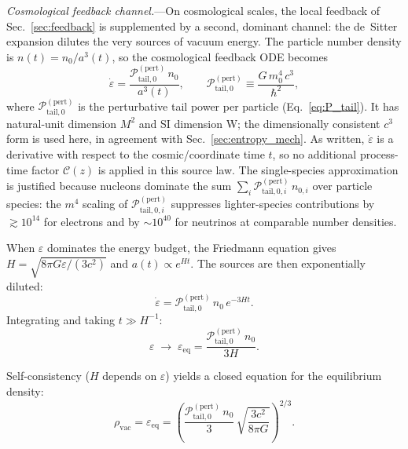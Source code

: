 \documentclass[aps,prd,onecolumn,superscriptaddress,nofootinbib,showpacs,12pt,notitlepage]{revtex4-2}
\begin{document}
\textit{Cosmological feedback channel.}---On cosmological
scales, the local feedback of Sec.~\ref{sec:feedback}
is supplemented by a second, dominant channel: the
de~Sitter expansion dilutes the very sources of vacuum
energy.  The particle number density is
$n(t) = n_0/a^{3}(t)$, so the cosmological feedback
ODE becomes
\begin{equation}\label{eq:feedback_cosmo}
  \dot{\varepsilon}
  = \frac{\mathcal{P}_{\mathrm{tail},0}^{\mathrm{(pert)}}\,n_0}
         {a^{3}(t)},
  \qquad
  \mathcal{P}_{\mathrm{tail},0}^{\mathrm{(pert)}} \equiv
  \frac{G\,m_0^{4}\,c^{3}}{\hbar^{2}},
\end{equation}
where $\mathcal{P}_{\mathrm{tail},0}^{\mathrm{(pert)}}$
is the perturbative tail power per particle
(Eq.~\ref{eq:P_tail}).  It has natural-unit dimension $M^2$
and SI dimension W; the dimensionally consistent $c^{3}$ form is
used here, in agreement with Sec.~\ref{sec:entropy_mech}.  As written,
$\dot{\varepsilon}$ is a derivative with respect to the cosmic/coordinate
time $t$, so no additional process-time factor $\mathcal{C}(z)$ is applied
in this source law.  The single-species
approximation is justified because nucleons dominate
the sum
$\sum_i \mathcal{P}_{\mathrm{tail},0,i}^{\mathrm{(pert)}}\,n_{0,i}$
over particle
species: the $m^{4}$ scaling of
$\mathcal{P}_{\mathrm{tail},0,i}^{\mathrm{(pert)}}$
suppresses lighter-species contributions by
$\gtrsim 10^{14}$ for electrons and by $\sim 10^{40}$
for neutrinos at comparable number densities.

When $\varepsilon$ dominates the energy budget, the Friedmann
equation gives $H = \sqrt{8\pi G\varepsilon/(3c^{2})}$
and $a(t) \propto e^{Ht}$.  The sources are then
exponentially diluted:
\begin{equation}
  \dot{\varepsilon}
  = \mathcal{P}_{\mathrm{tail},0}^{\mathrm{(pert)}}\,n_0\,e^{-3Ht}.
\end{equation}
Integrating and taking $t \gg H^{-1}$:
\begin{equation}\label{eq:epsilon_equil}
  \varepsilon \;\longrightarrow\;
  \varepsilon_{\mathrm{eq}}
  = \frac{\mathcal{P}_{\mathrm{tail},0}^{\mathrm{(pert)}}\,n_0}{3H}.
\end{equation}

Self-consistency ($H$ depends on $\varepsilon$) yields a
closed equation for the equilibrium density:
\begin{equation}\label{eq:rho_vac_eq}
  \boxed{
  \rho_{\mathrm{vac}}
  = \varepsilon_{\mathrm{eq}}
  = \left(\frac{
    \mathcal{P}_{\mathrm{tail},0}^{\mathrm{(pert)}}\,n_0}{3}\,
    \sqrt{\frac{3c^{2}}{8\pi G}}\right)^{2/3}.
  }
\end{equation}
\end{document}

